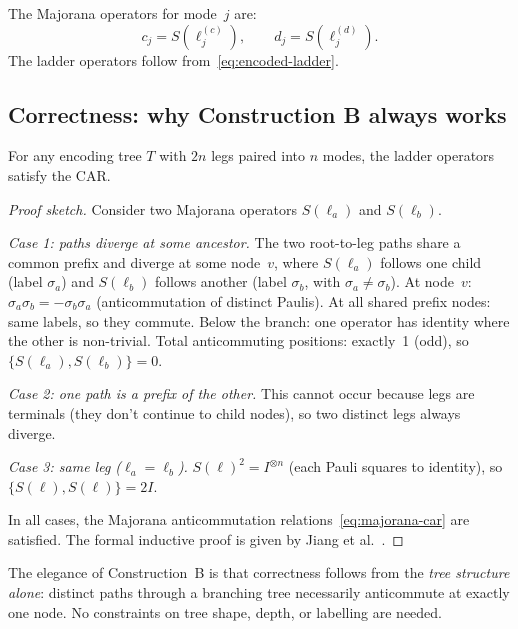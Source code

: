 The Majorana operators for mode~$j$ are:
\begin{equation}
  c_j = S(\ell_j^{(c)}), \qquad d_j = S(\ell_j^{(d)}).
\end{equation}
The ladder operators follow from~\eqref{eq:encoded-ladder}.

\subsection{Correctness: why Construction B always works}
\label{sec:tree-car-proof}

\begin{theorem}
\label{thm:tree-car}
For any encoding tree $T$ with $2n$ legs paired into $n$ modes, the
ladder operators satisfy the CAR.
\end{theorem}

\begin{proof}[Proof sketch]
Consider two Majorana operators $S(\ell_a)$ and $S(\ell_b)$.

\emph{Case 1: paths diverge at some ancestor.}
The two root-to-leg paths share a common prefix and diverge at some
node~$v$, where $S(\ell_a)$ follows one child (label $\sigma_a$) and
$S(\ell_b)$ follows another (label $\sigma_b$, with $\sigma_a \neq
\sigma_b$).  At node~$v$: $\sigma_a \sigma_b = -\sigma_b \sigma_a$
(anticommutation of distinct Paulis).  At all shared prefix
nodes: same labels, so they commute.  Below the branch: one operator
has identity where the other is non-trivial.  Total anticommuting
positions: exactly~1 (odd), so $\{S(\ell_a), S(\ell_b)\} = 0$.

\emph{Case 2: one path is a prefix of the other.}
This cannot occur because legs are terminals (they don't continue
to child nodes), so two distinct legs always diverge.

\emph{Case 3: same leg ($\ell_a = \ell_b$).}
$S(\ell)^2 = I^{\otimes n}$ (each Pauli squares to identity),
so $\{S(\ell), S(\ell)\} = 2I$.

In all cases, the Majorana anticommutation
relations~\eqref{eq:majorana-car} are satisfied.  The formal
inductive proof is given by Jiang et al.~\cite{jiang2020}.
\end{proof}

The elegance of Construction~B is that correctness follows from the
\emph{tree structure alone}: distinct paths through a branching tree
necessarily anticommute at exactly one node.  No constraints on tree
shape, depth, or labelling are needed.

